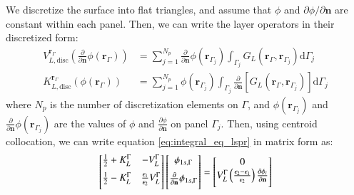 We discretize the surface into flat triangles, and assume that  $\phi$ and 
$\partial \phi/\partial \mathbf{n}$ are constant within each panel. Then, we can
write the layer operators in their discretized form:
%
\begin{align} \label{eq:layers_disc}
V_{L,\text{disc}}^{\mathbf{r}_\Gamma} \left( \frac{\partial}{\partial \mathbf{n}} \phi(\mathbf{r}_{\Gamma}) \right) &= \sum_{j=1}^{N_p} \frac{\partial}{\partial \mathbf{n}} \phi(\mathbf{r}_{\Gamma_j}) \int_{\Gamma_j} G_L(\mathbf{r}_\Gamma,\mathbf{r}_{\Gamma_j})  \mathrm{d} \Gamma_j  \nonumber \\
K_{L,\text{disc}}^{\mathbf{r}_\Gamma}(\phi(\mathbf{r}_{\Gamma})) &=  \sum_{j=1}^{N_p}\phi(\mathbf{r}_{\Gamma_j})\int_{\Gamma_j} \frac{\partial}{\partial \mathbf{n}} \left[ G_L(\mathbf{r}_\Gamma,\mathbf{r}_{\Gamma_j}) \right]\mathrm{d} \Gamma_j
\end{align}
%
\noindent where $N_p$ is the number of discretization elements on $\Gamma$, 
and $\phi(\mathbf{r}_{\Gamma_j})$ and $\frac{\partial}{\partial \mathbf{n}} 
\phi(\mathbf{r}_{\Gamma_j})$ are the values of $\phi$ and 
$\frac{\partial \phi}{\partial \mathbf{n}}$ on panel $\Gamma_j$.
Then, using centroid collocation, we can write equation \eqref{eq:integral_eq_lspr} in matrix form as:
%
 \begin{equation} \label{eq:matrix_lspr}
 \left[
    \begin{matrix} 
       \frac{1}{2} + K_{L}^{\Gamma} & -V_{L}^{\Gamma}  \vspace{0.2cm} \\
       \frac{1}{2} - K_{L}^{\Gamma} &  \frac{\epsilon_1}{\epsilon_2} V_{L}^{\Gamma}  \vspace{0.2cm} 
    \end{matrix}
    \right] \left[ 
    \begin{matrix} 
       \phi_{1s,\Gamma} \vspace{0.2cm} \\
       \frac{\partial}{\partial \mathbf{n}} \phi_{1s,\Gamma} \vspace{0.2cm}
    \end{matrix} 
     \right] =   
    \left[
    \begin{matrix} 
       0 \\
       V_{L}^{\Gamma} \left(\frac{\epsilon_2-\epsilon_1}{\epsilon_2}\right) \frac{\partial\phi_i}{\partial\mathbf{n}} \vspace{0.2cm} 
    \end{matrix}
    \right]
 \end{equation}
